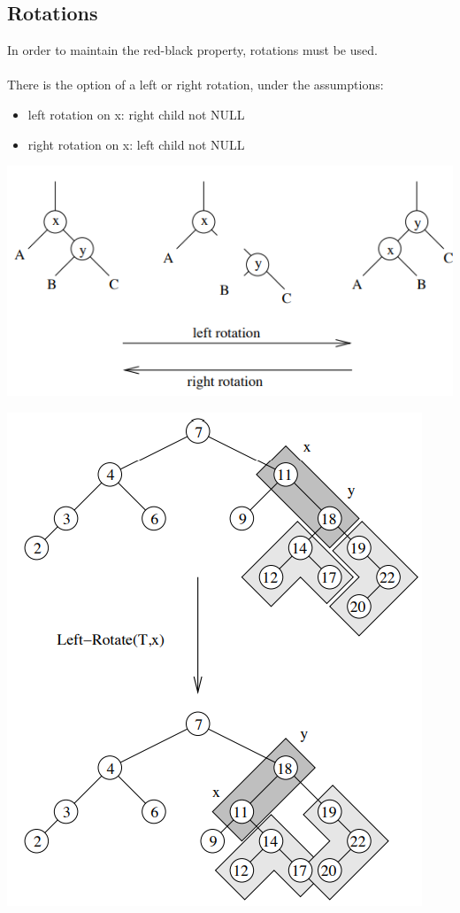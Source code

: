 \documentclass{article}[18pt]
\begin{document}
\subsection{Rotations}
In order to maintain the red-black property, rotations must be used.\\
\\
There is the option of a left or right rotation, under the assumptions:
\begin{itemize}
	\item left rotation on x: right child not NULL
	\item right rotation on x: left child not NULL
\end{itemize}
\begin{center}
	\includegraphics[scale=0.7]{rotate}
\end{center}
\begin{center}
	\includegraphics[scale=0.7]{rotate1}
\end{center}
\end{document}
